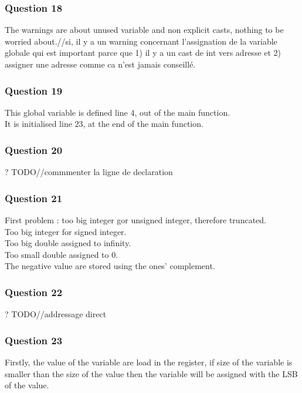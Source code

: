 \documentclass[a4paper,10pt]{article}
\begin{document}
\subsubsection*{Question 18}
The warnings are about unused variable and non explicit casts, nothing to be worried about.//si, il y a un warning concernant l'assignation de la variable globale qui est important parce que 1) il y a un cast de int vers adresse et 2) assigner une adresse comme ca n'est jamais conseillé.

\subsubsection*{Question 19}
This global variable is defined line 4, out of the main function.\\
It is initialised line 23, at the end of the main function.

\subsubsection*{Question 20}
? TODO//commmenter la ligne de declaration

\subsubsection*{Question 21}
First problem : too big integer gor unsigned integer, therefore truncated.\\
Too big integer for signed integer.\\
Too big double assigned to infinity.\\
Too small double assigned to 0.\\
The negative value are stored using the ones' complement.

\subsubsection*{Question 22}
? TODO//addressage direct

\subsubsection*{Question 23}
Firstly, the value of the variable are load in the register, if size of the variable is smaller than the size of the value then the variable will be assigned with the LSB of the value.\\
\end{document}
